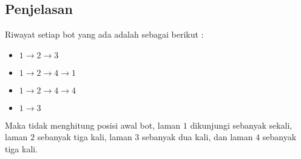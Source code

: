 \documentclass{article}
\begin{document}
\subsection*{Penjelasan}
Riwayat setiap  bot yang ada adalah sebagai berikut :
\begin{itemize}
    \setlength\itemsep{0pt}
    \item $1 \rightarrow 2 \rightarrow 3$
    \item $1 \rightarrow 2 \rightarrow 4 \rightarrow 1$
    \item $1 \rightarrow 2 \rightarrow 4 \rightarrow 4$
    \item $1 \rightarrow 3$
\end{itemize}
Maka tidak menghitung posisi awal bot, laman $1$ dikunjungi sebanyak sekali, laman $2$ sebanyak tiga kali, laman $3$ sebanyak dua kali, dan laman $4$ sebanyak tiga kali.

\pagebreak
\end{document}
